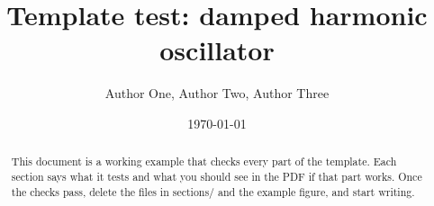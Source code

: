 \documentclass[11pt,letterpaper]{article}
\title{\textbf{Template test: damped harmonic oscillator}}
\author{%
   Author One\authormark{author1}{\dag},
   Author Two\authormark{author2}{*},
   Author Three\authormark{author3}{\oplus}}
\date{\today}
\begin{document}
\maketitle
\thispagestyle{firstpage}   %

\begin{abstract}
This document is a working example that checks every part of the template.
Each section says what it tests and what you should see in the PDF if that part works.
Once the checks pass, delete the files in sections/ and the example figure, and start writing.
\end{abstract}





\printbibliography
\end{document}
